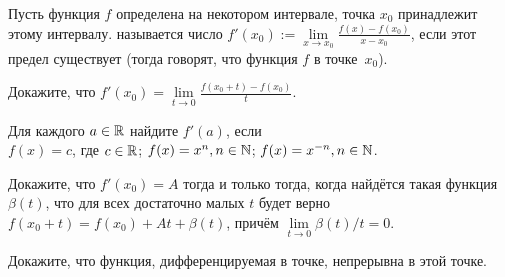 \documentclass[a4paper, 12pt]{article}
\begin{document}






Пусть функция $f$ определена на некотором интервале, точка $x_0$
принадлежит этому интервалу.
 называется число
$f'(x_0):=\lim\limits_{x\to x_0}\frac{f(x)-f(x_0)}{x-x_0}$,
если этот предел существует (тогда говорят, что функция $f$
 в точке~$x_0$).

 Докажите, что
$f'(x_0)=\lim\limits_{t\to 0}\frac{f(x_0+t)-f(x_0)}{t}$.

Для каждого $a\in\mathbb{R}$ найдите $f'(a)$, если\\
 $f(x)=c$, где $c\in\mathbb{R}$;
 $f(x)=x^n, n\in \mathbb{N}$;
 $f(x)=x^{-n}, n\in \mathbb{N}$.

 Докажите, что $f'(x_0)=A$
тогда и только тогда, когда найд\"ется такая функция $\beta(t)$, что
для всех достаточно малых $t$ будет верно
$f(x_0+t)=f(x_0)+At+\beta(t)$,
прич\"ем $\lim\limits_{t\to0}\beta(t)/t=0$.


Докажите, что функция, дифференцируемая в точке,
непрерывна в этой точке. %


\end{document}
